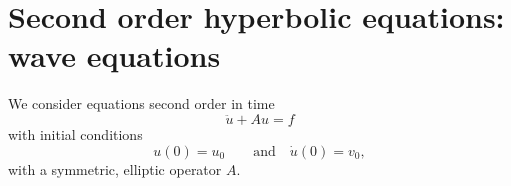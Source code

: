








% 

\chapter{Second order hyperbolic equations: wave equations}
We consider  equations second order in time
$$
\ddot u + A u = f
$$
with initial conditions
$$
u(0) = u_0 \qquad \text{and}  \quad \dot u(0) = v_0,
$$
with a symmetric, elliptic operator $A$. 

